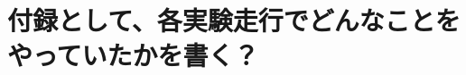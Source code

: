 \documentclass[twocolumn,9pt]{jsproceedings}
\begin{document}
\clearpage

\section{付録として、各実験走行でどんなことをやっていたかを書く？}
\end{document}
